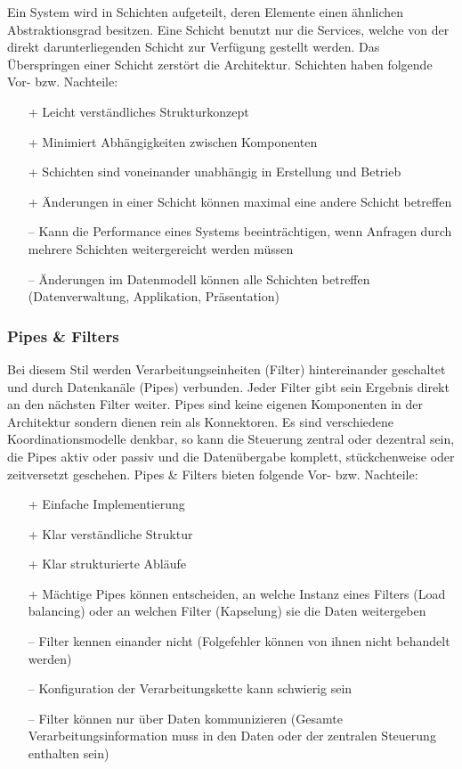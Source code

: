 Ein System wird in Schichten aufgeteilt, deren Elemente einen ähnlichen Abstraktionsgrad besitzen. Eine Schicht benutzt nur die Services, welche von der direkt darunterliegenden Schicht zur Verfügung gestellt werden. Das Überspringen einer Schicht zerstört die Architektur. Schichten haben folgende Vor- bzw. Nachteile:
\begin{itemize}
	\item[+] Leicht verständliches Strukturkonzept
	\item[+] Minimiert Abhängigkeiten zwischen Komponenten
	\item[+] Schichten sind voneinander unabhängig in Erstellung und Betrieb
	\item[+] Änderungen in einer Schicht können maximal eine andere Schicht betreffen
	\item[--] Kann die Performance eines Systems beeinträchtigen, wenn Anfragen durch mehrere Schichten weitergereicht werden müssen
	\item[--] Änderungen im Datenmodell können alle Schichten betreffen (Datenverwaltung, Applikation, Präsentation)
\end{itemize}

\subsubsection{Pipes \& Filters}

Bei diesem Stil werden Verarbeitungseinheiten (Filter) hintereinander geschaltet und durch Datenkanäle (Pipes) verbunden. Jeder Filter gibt sein Ergebnis direkt an den nächsten Filter weiter. Pipes sind keine eigenen Komponenten in der Architektur sondern dienen rein als Konnektoren. Es sind verschiedene Koordinationsmodelle denkbar, so kann die Steuerung zentral oder dezentral sein, die Pipes aktiv oder passiv und die Datenübergabe komplett, stückchenweise oder zeitversetzt geschehen. Pipes \& Filters bieten folgende Vor- bzw. Nachteile:
\begin{itemize}
	\item[+] Einfache Implementierung
	\item[+] Klar verständliche Struktur
	\item[+] Klar strukturierte Abläufe
	\item[+] Mächtige Pipes können entscheiden, an welche Instanz eines Filters (Load balancing) oder an welchen Filter (Kapselung) sie die Daten weitergeben
	\item[--] Filter kennen einander nicht (Folgefehler können von ihnen nicht behandelt werden)
	\item[--] Konfiguration der Verarbeitungskette kann schwierig sein
	\item[--] Filter können nur über Daten kommunizieren (Gesamte Verarbeitungsinformation muss in den Daten oder der zentralen Steuerung enthalten sein)
\end{itemize}

